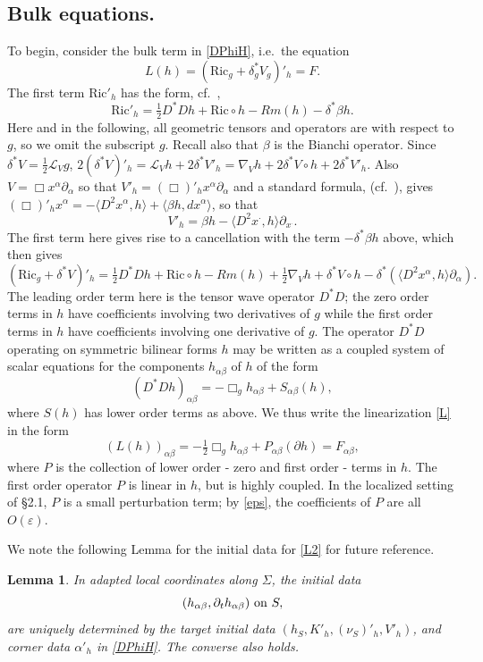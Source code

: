 \documentclass[10pt]{amsart}
\renewcommand{\a}{\alpha}
\renewcommand{\b}{\beta}
\renewcommand{\d}{\delta}
\newcommand{\e}{\varepsilon}
\newcommand{\Si}{\Sigma}
\newcommand{\cL}{{\mathcal L}}
\newcommand{\Ric}{\mathrm{Ric}}
\newcommand{\be}{\begin{equation}}
\newcommand{\ee}{\end{equation}}
\newcommand{\p}{\partial}
\newcommand{\<}{\langle}
\renewcommand{\>}{\rangle}
\theoremstyle{plain}
\newtheorem{lemma}{Lemma}[section]
\theoremstyle{remark}
\theoremstyle{definition}
\numberwithin{equation}{section}
\begin{document}
 \subsection{Bulk equations.}

To begin, consider the bulk term in \eqref{DPhiH}, i.e.~the equation
 \be \label{L}
L(h) = (\Ric_g + \d_g^*V_g)'_h = F. 
 \ee
 The first term $\Ric'_h$ has the form, cf.~\cite{B}, 
$$\Ric'_h = \tfrac{1}{2}D^*D h +\Ric \circ h - Rm(h) - \d^*\b h.$$
Here and in the following, all geometric tensors and operators are with respect to $g$, so we omit the subscript $g$. 
Recall also that $\b$ is the Bianchi operator. Since $\d^* V = \frac{1}{2}\cL_V g$, $2(\d^*V)'_h = \cL_V h + 2\d^* V'_h  = \nabla_V h + 
2\d^* V \circ h + 2\d^*V'_h$. Also $V = \Box x^{\a} \p_{\a}$ so that $V'_h = (\Box)'_h x^{\a}\p_{\a}$ and a standard formula, (cf.~\cite{B}), 
gives $(\Box)'_h x^{\a} = -\<D^2 x^{\a}, h\> + \<\b h, dx^{\a}\>$, so that 
 \be \label{V'h}
 V'_h = \b h - \<D^2 x^{\cdot}, h\>\p_{x^{\cdot}}. 
 \ee
 The first term here gives rise to a cancellation with the term $-\d^*\b h$ above, which then gives 
$$(\Ric_g + \d^*V)'_h = \tfrac{1}{2}D^*D h + \Ric \circ h - Rm(h) + \tfrac{1}{2}\nabla_V h + \d^* V \circ h - \d^* (\<D^2 x^{\a}, h\> \p_{\a}) .$$
The leading order term here is the tensor wave operator $D^*D$; the zero order terms in $h$ have coefficients involving two derivatives of 
$g$ while the first order terms in $h$ have coefficients involving one derivative of $g$. The operator $D^*D$ operating on symmetric bilinear 
forms $h$ may be written as a coupled system of scalar equations for the components $h_{\a\b}$ of $h$ of the form 
$$(D^*Dh)_{\a\b} = -\Box_g h_{\a\b} + S_{\a\b}(h),$$
where $S(h)$ has lower order terms as above. We thus write the linearization \eqref{L} in the form 
\be \label{L2}
(L(h))_{\a\b} = -\tfrac{1}{2}\Box_g h_{\a\b} + P_{\a\b}(\p h) = F_{\a\b},
\ee
where $P$ is the collection of lower order - zero and first order - terms in $h$. The first order operator $P$ is linear in $h$, 
but is highly coupled. In the localized setting of \S 2.1, $P$ is a small perturbation term; by \eqref{eps}, the coefficients of $P$ are all $O(\e)$.

\medskip 

We note the following Lemma for the initial data for \eqref{L2} for future reference. 

\begin{lemma}\label{hS}
In adapted local coordinates along $\Si$, the initial data 
$$(h_{\a\b}, \p_t h_{\a\b}) \  {\rm on} \  S,$$
are uniquely determined by the target initial data $(h_S, K'_h, (\nu_S)'_h, V'_h)$, and corner data $\a'_h$ in \eqref{DPhiH}. The converse also holds. 
\end{lemma}
\end{document}

